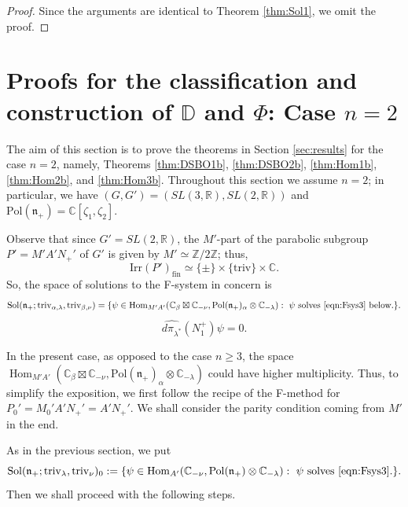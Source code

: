 \documentclass[reqno,11pt]{amsart}
\theoremstyle{remark}
\theoremstyle{definition}
\numberwithin{equation}{section}
\newcommand{\fn}{{\mathfrak n}}
\newcommand{\R}{\mathbb{R}}
\newcommand{\C}{\mathbb{C}}
\newcommand{\Z}{\mathbb{Z}}
\newcommand{\Hom}{\operatorname{Hom}}
\newcommand{\Sol}{\mathrm{Sol}}
\newcommand{\Pol}{\mathrm{Pol}}
\newcommand{\Irr}{\mathrm{Irr}}
\newcommand{\triv}{\mathrm{triv}}
\newcommand{\fin}{\mathrm{fin}}
\newcommand{\dpi}{d\pi}
\newcommand{\bD}{\mathbb{D}}
\begin{document}
\begin{proof}
Since
the arguments are identical to Theorem \ref{thm:Sol1},
we omit the proof.
\end{proof}


\section{Proofs for the classification and construction of $\bD$ and $\Phi$:
Case $n=2$}
\label{sec:proof2}

The aim of this section is to prove the theorems in Section \ref{sec:results} 
for the case $n=2$, namely,
Theorems \ref{thm:DSBO1b}, \ref{thm:DSBO2b}, \ref{thm:Hom1b},
\ref{thm:Hom2b}, and \ref{thm:Hom3b}. 
Throughout this section we assume $n=2$; in particular, we have 
$(G,G') = (SL(3,\R), SL(2,\R))$ and
$\Pol(\fn_+) = \C[\zeta_1,\zeta_2]$.

Observe that since $G'=SL(2,\R)$, the $M'$-part of 
the parabolic subgroup $P'=M'A'N_+'$ of $G'$ is given by $M'\simeq \Z/2\Z$;
thus,
\begin{equation*}
\Irr(P')_{\fin}\simeq 
\{\pm\} \times \{\triv\} \times \C.
\end{equation*}
\noindent
So, the space of solutions to the F-system in concern is 
\begin{align*}
\Sol(\fn_+; \triv_{\alpha, \lambda}, \triv_{\beta, \nu})
=
\{ \psi \in 
\Hom_{M'A'}(\C_{\beta}\boxtimes \C_{-\nu}, 
\Pol(\fn_+)_{\alpha}\otimes \C_{-\lambda}): 
\text{
$\psi$ solves \eqref{eqn:Fsys3} below.}\}.
\end{align*}
\begin{equation}\label{eqn:Fsys3}
\widehat{\dpi_{\lambda^*}}(N_1^+)\psi =0.
\end{equation}


In the present case, as opposed to the case $n\geq 3$, 
the space $\Hom_{M'A'}(\C_{\beta}\boxtimes \C_{-\nu}, 
\Pol(\fn_+)_{\alpha}\otimes \C_{-\lambda})$ 
could have higher multiplicity. 
Thus,
to simplify the exposition,
we first follow the recipe of the F-method  for 
$P_0' = M_0'A'N_+'=A'N_+'$. We shall consider the parity condition coming from
$M'$ in the end. 

As in the previous section, we put
\begin{equation*}
\Sol(\fn_+; \triv_{\lambda}, \triv_{\nu})_0
:=
\{ \psi \in 
\Hom_{A'}(\C_{-\nu}, 
\Pol(\fn_+)\otimes \C_{-\lambda}): 
\text{
$\psi$ solves \eqref{eqn:Fsys3}.}\}.
\end{equation*}
Then we shall proceed with the following steps.
\end{document}
